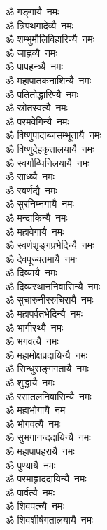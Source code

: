 \begin{multicols}{2}
\begin{flushleft}
ॐ गङ्गायै~नमः\\
ॐ त्रिपथगादेव्यै~नमः\\
ॐ शम्भुमौलिविहारिण्यै~नमः\\
ॐ जाह्नव्यै~नमः\\
ॐ पापहन्त्र्यै~नमः\\
ॐ महापातकनाशिन्यै~नमः\\
ॐ पतितोद्धारिण्यै~नमः\\
ॐ स्रोतस्वत्यै~नमः\\
ॐ परमवेगिन्यै~नमः\\
ॐ विष्णुपादाब्जसम्भूतायै~नमः\hfill{}\\
ॐ विष्णुदेहकृतालयायै~नमः\\
ॐ स्वर्गाब्धिनिलयायै~नमः\\
ॐ साध्व्यै~नमः\\
ॐ स्वर्णद्यै~नमः\\
ॐ सुरनिम्नगायै~नमः\\
ॐ मन्दाकिन्यै~नमः\\
ॐ महावेगायै~नमः\\
ॐ स्वर्णशृङ्गप्रभेदिन्यै~नमः\\
ॐ देवपूज्यतमायै~नमः\\
ॐ दिव्यायै~नमः\hfill{}\\
ॐ दिव्यस्थाननिवासिन्यै~नमः\\
ॐ सुचारुनीररुचिरायै~नमः\\
ॐ महापर्वतभेदिन्यै~नमः\\
ॐ भागीरथ्यै~नमः\\
ॐ भगवत्यै~नमः\\
ॐ महामोक्षप्रदायिन्यै~नमः\\
ॐ सिन्धुसङ्गगतायै~नमः\\
ॐ शुद्धायै~नमः\\
ॐ रसातलनिवासिन्यै~नमः\\
ॐ महाभोगायै~नमः\hfill{}\\
ॐ भोगवत्यै~नमः\\
ॐ सुभगानन्ददायिन्यै~नमः\\
ॐ महापापहरायै~नमः\\
ॐ पुण्यायै~नमः\\
ॐ परमाह्लाददायिन्यै~नमः\\
ॐ पार्वत्यै~नमः\\
ॐ शिवपत्न्यै~नमः\\
ॐ शिवशीर्षगतालयायै~नमः\\

\end{flushleft}
\end{multicols}
